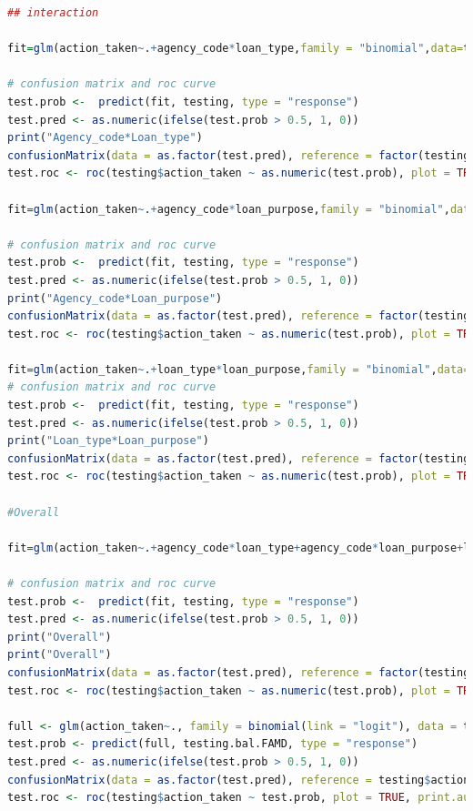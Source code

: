 \documentclass{jpp}
\begin{document}
\begin{lstlisting}[language=R]
## interaction

fit=glm(action_taken~.+agency_code*loan_type,family = "binomial",data=training.bal)

# confusion matrix and roc curve
test.prob <-  predict(fit, testing, type = "response")
test.pred <- as.numeric(ifelse(test.prob > 0.5, 1, 0))
print("Agency_code*Loan_type")
confusionMatrix(data = as.factor(test.pred), reference = factor(testing$action_taken), positive = "1")
test.roc <- roc(testing$action_taken ~ as.numeric(test.prob), plot = TRUE, print.auc = TRUE)

fit=glm(action_taken~.+agency_code*loan_purpose,family = "binomial",data=training.bal)

# confusion matrix and roc curve
test.prob <-  predict(fit, testing, type = "response")
test.pred <- as.numeric(ifelse(test.prob > 0.5, 1, 0))
print("Agency_code*Loan_purpose")
confusionMatrix(data = as.factor(test.pred), reference = factor(testing$action_taken), positive = "1")
test.roc <- roc(testing$action_taken ~ as.numeric(test.prob), plot = TRUE, print.auc = TRUE)

fit=glm(action_taken~.+loan_type*loan_purpose,family = "binomial",data=training.bal)
# confusion matrix and roc curve
test.prob <-  predict(fit, testing, type = "response")
test.pred <- as.numeric(ifelse(test.prob > 0.5, 1, 0))
print("Loan_type*Loan_purpose")
confusionMatrix(data = as.factor(test.pred), reference = factor(testing$action_taken), positive = "1")
test.roc <- roc(testing$action_taken ~ as.numeric(test.prob), plot = TRUE, print.auc = TRUE)

#Overall

fit=glm(action_taken~.+agency_code*loan_type+agency_code*loan_purpose+loan_type*loan_purpose,family = "binomial",data=training.bal)

# confusion matrix and roc curve
test.prob <-  predict(fit, testing, type = "response")
test.pred <- as.numeric(ifelse(test.prob > 0.5, 1, 0))
print("Overall")
print("Overall")
confusionMatrix(data = as.factor(test.pred), reference = factor(testing$action_taken), positive = "1")
test.roc <- roc(testing$action_taken ~ as.numeric(test.prob), plot = TRUE, print.auc = TRUE)

full <- glm(action_taken~., family = binomial(link = "logit"), data = training.bal.FAMD)
test.prob <- predict(full, testing.bal.FAMD, type = "response")
test.pred <- as.numeric(ifelse(test.prob > 0.5, 1, 0))
confusionMatrix(data = as.factor(test.pred), reference = testing$action_taken, positive = "1")
test.roc <- roc(testing$action_taken ~ test.prob, plot = TRUE, print.auc = TRUE)


\end{lstlisting}
\end{document}
